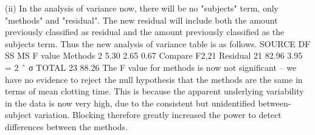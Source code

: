 \documentclass[a4paper,12pt]{article}
\begin{document}
 
 
 
(ii) In the analysis of variance now, there will be no "subjects" term, only "methods" and "residual".  The new residual will include both the amount previously classified as residual and the amount previously classified as the subjects term.  Thus the new analysis of variance table is as follows. 
 SOURCE DF SS MS F value Methods   2   5.30 2.65        0.67   Compare F2,21 Residual 21 82.96 3.95 = 2 ˆ σ
 TOTAL 23 88.26   
 The F value for methods is now not significant  –  we have no evidence to reject the null hypothesis that the methods are the same in terms of mean clotting time.  This is because the apparent underlying variability in the data is now very high, due to the consistent but unidentified between-subject variation.  Blocking therefore greatly increased the power to detect differences between the methods. 
 
 
\end{document}
